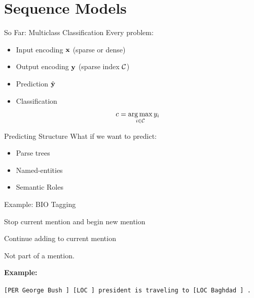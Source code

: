 \documentclass{beamer}
\begin{document}
\section{Sequence Models}

\begin{frame}
  
\end{frame}

\begin{frame}
  
\end{frame}

\begin{frame}{So Far: Multiclass Classification}
  Every problem:
  \begin{itemize}
  \item Input encoding $\mathbf{x}$ (sparse or dense)
    \air 

  \item Output encoding $\mathbf{y}$ (sparse index $\mathcal{C}$)
    \air 
  
  \item Prediction $\hat{\mathbf{y}}$  
    \air 
    
  \item Classification 
    \[c = \argmax_{i\in \mcC} y_i \]
  \end{itemize}
\end{frame}

\begin{frame}{Predicting Structure}
  What if we want to predict:
  \begin{itemize}
  \item Parse trees
    \air 

  \item Named-entities
    \air 

  \item Semantic Roles
  \end{itemize}
\end{frame}

\begin{frame}{Example: BIO Tagging}
  \begin{description} \itemsep 20pt
  \item[B-TYPE] Stop current mention and begin new mention
    \air 
  \item[I-TYPE] Continue adding to current mention
  \item[O ] Not part of a mention.
  \end{description}
  \pause
  
  \textbf{Example:} \air

  \texttt{[PER \alert{George Bush} ]  [LOC  ] president is traveling to [LOC \alert{Baghdad} ] .  } 
\end{frame}
\end{document}
